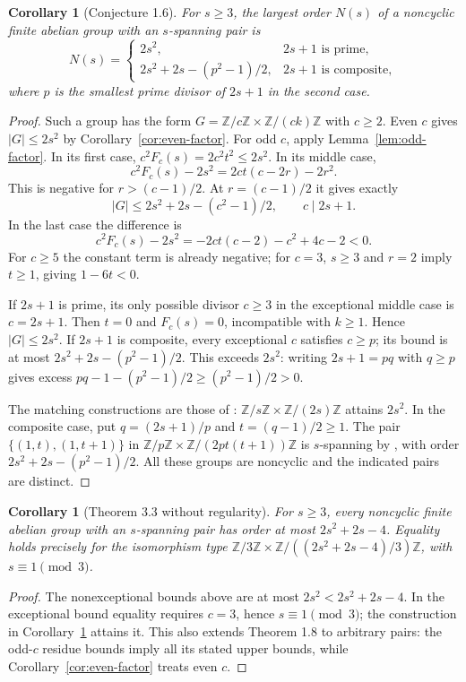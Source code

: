 \documentclass[11pt]{article}
\newtheorem{corollary}[theorem]{Corollary}
\newcommand{\Z}{\mathbb Z}
\begin{document}
\begin{corollary}[Conjecture 1.6]\label{cor:global}
For $s\ge3$, the largest order $N(s)$ of a noncyclic finite abelian
group with an $s$-spanning pair is
\[
N(s)=\begin{cases}
2s^2,&2s+1\text{ is prime},\\
2s^2+2s-(p^2-1)/2,&2s+1\text{ is composite},
\end{cases}
\]
where $p$ is the smallest prime divisor of $2s+1$ in the second case.
\end{corollary}
\begin{proof}
Such a group has the form $G=\Z/c\Z\times\Z/(ck)\Z$ with $c\ge2$.
Even $c$ gives $|G|\le2s^2$ by Corollary~\ref{cor:even-factor}.
For odd $c$, apply Lemma~\ref{lem:odd-factor}.
In its first case, $c^2F_c(s)=2c^2t^2\le2s^2$.
In its middle case,
\[
c^2F_c(s)-2s^2=2ct(c-2r)-2r^2.
\]
This is negative for $r>(c-1)/2$. At $r=(c-1)/2$ it gives exactly
\[
|G|\le2s^2+2s-(c^2-1)/2,\qquad c\mid 2s+1.
\]
In the last case the difference is
\[
c^2F_c(s)-2s^2=-2ct(c-2)-c^2+4c-2<0.
\]
For $c\ge5$ the constant term is already negative; for $c=3$, $s\ge3$
and $r=2$ imply $t\ge1$, giving $1-6t<0$.

If $2s+1$ is prime, its only possible divisor $c\ge3$ in the exceptional
middle case is $c=2s+1$. Then $t=0$ and $F_c(s)=0$, incompatible with
$k\ge1$. Hence $|G|\le2s^2$.
If $2s+1$ is composite, every exceptional $c$ satisfies $c\ge p$;
its bound is at most $2s^2+2s-(p^2-1)/2$.
This exceeds $2s^2$: writing $2s+1=pq$ with $q\ge p$ gives excess
$pq-1-(p^2-1)/2\ge(p^2-1)/2>0$.

The matching constructions are those of \cite[Theorem 1.7,
Proposition 2.3 and Corollary 2.5]{BB}:
$\Z/s\Z\times\Z/(2s)\Z$ attains $2s^2$.
In the composite case, put $q=(2s+1)/p$ and $t=(q-1)/2\ge1$.
The pair $\{(1,t),(1,t+1)\}$ in
$\Z/p\Z\times\Z/(2pt(t+1))\Z$ is $s$-spanning by
\cite[Theorem 2.4]{BB}, with order $2s^2+2s-(p^2-1)/2$.
All these groups are noncyclic and the indicated pairs are distinct.
\end{proof}

\begin{corollary}[Theorem 3.3 without regularity]\label{cor:universal}
For $s\ge3$, every noncyclic finite abelian group with an $s$-spanning
pair has order at most $2s^2+2s-4$.
Equality holds precisely for the isomorphism type
$\Z/3\Z\times\Z/((2s^2+2s-4)/3)\Z$, with $s\equiv1\pmod3$.
\end{corollary}
\begin{proof}
The nonexceptional bounds above are at most $2s^2<2s^2+2s-4$.
In the exceptional bound equality requires $c=3$, hence
$s\equiv1\pmod3$; the construction in Corollary~\ref{cor:global}
attains it. This also extends Theorem 1.8 to arbitrary pairs:
the odd-$c$ residue bounds imply all its stated upper bounds, while
Corollary~\ref{cor:even-factor} treats even $c$.
\end{proof}
\end{document}
